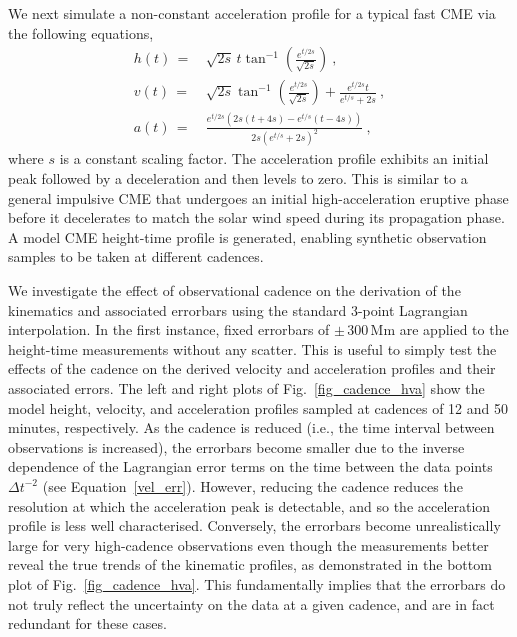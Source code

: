 \documentclass[structabstract]{aa}
\begin{document}
We next simulate a non-constant acceleration profile for a typical fast CME via the following equations,
\begin{eqnarray}
h(t)\,=&\,\sqrt{2s}\,t\tan^{-1}\left(\frac{e^{t/2s}}{\sqrt{2s}}\right) \ , \\
v(t)\,=&\,\sqrt{2s}\tan^{-1}\left(\frac{e^{t/2s}}{\sqrt{2s}}\right)+\frac{e^{t/2s}t}{e^{t/s}+2s} \ , \\
a(t)\,=&\,\frac{e^{t/2s}\left(2s\left(t+4s\right)-e^{t/s}\left(t-4s\right)\right)}{2s\left(e^{t/s}+2s\right)^2}\ ,
\label{eqn:nonconst_a}
\end{eqnarray}
where $s$ is a constant scaling factor. The acceleration profile exhibits an initial peak followed by a deceleration and then levels to zero. This is similar to a general impulsive CME that undergoes an initial high-acceleration eruptive phase before it decelerates to match the solar wind speed during its propagation phase. A model CME height-time profile is generated, enabling synthetic observation samples to be taken at different cadences. 


We investigate the effect of observational cadence on the derivation of the kinematics and associated errorbars using the standard 3-point Lagrangian interpolation. In the first instance, fixed errorbars of $\pm\,300$\,Mm are applied to the height-time measurements without any scatter. This is useful to simply test the effects of the cadence on the derived velocity and acceleration profiles and their associated errors. The left and right plots of Fig.~\ref{fig_cadence_hva} show the model height, velocity, and acceleration profiles sampled at cadences of 12 and 50\,minutes, respectively. As the cadence is reduced (i.e., the time interval between observations is increased), the errorbars become smaller due to the inverse dependence of the Lagrangian error terms on the time between the data points $\Delta t^{-2}$ (see Equation~\ref{vel_err}). However, reducing the cadence reduces the resolution at which the acceleration peak is detectable, and so the acceleration profile is less well characterised. Conversely, the errorbars become unrealistically large for very high-cadence observations even though the measurements better reveal the true trends of the kinematic profiles, as demonstrated in the bottom plot of Fig.~\ref{fig_cadence_hva}. This fundamentally implies that the errorbars do not truly reflect the uncertainty on the data at a given cadence, and are in fact redundant for these cases.
\end{document}
